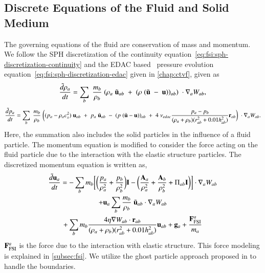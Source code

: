 \subsection{Discrete Equations of the Fluid and Solid Medium}\label{subsec:discrete-fluid}
The governing equations of the fluid are conservation of mass and momentum. We
follow the SPH discretization of the continuity
equation~\eqref{eq:fsi:sph-discretization-continuity} and the EDAC
based~\parencite{PRKP:edac-sph-iccm2015} pressure evolution
equation~\eqref{eq:fsi:sph-discretization-edac} given in \cref{chap:ctvf}, given
as
\begin{equation}
  \label{eq:fsi:sph-discretization-continuity}
  \frac{\tilde{d}\rho_a}{dt} = \sum_{b} \; \frac{m_b}{\rho_{b}} \; (
  \rho_{a} \; \tilde{\mathbf{u}}_{ab} \; + \;
  (\rho \; (\tilde{\mathbf{u}} \; - \;
  \mathbf{u}))_{ab}) \; \cdot \nabla_{a} W_{ab},
\end{equation}
\begin{multline}
  \label{eq:fsi:sph-discretization-edac}
  \frac{\tilde{d}p_a}{dt} = \sum_{b} \; \frac{m_b}{\rho_{b}} \; \bigg(
  (p_{a} - \rho_{a} c_{s}^2) \; \mathbf{u}_{ab} \; + \;
  p_{a} \; \tilde{\mathbf{u}}_{ab} \; - \;
  (p \; (\tilde{\mathbf{u}} - \mathbf{u}))_{ab} \; + \;
  4 \; \nu_{edac}
  \frac{p_a - p_b}{(\rho_a + \rho_b) (r^2_{ab} + 0.01 h_{ab}^{2})} \mathbf{r}_{ab}
  \bigg) \; \cdot \nabla_{a} W_{ab}.
\end{multline}
%
Here, the summation also includes the solid particles in the influence of a
fluid particle. The momentum equation is modified to consider the force
acting on the fluid particle due to the interaction with the elastic structure
particles. The discretized momentum equation is written as,
\begin{multline}
  \label{eq:fsi:sph-momentum-fluid}
  \frac{\tilde{d}\mathbf{u}_{a}}{dt} = - \sum_{b} m_b \bigg[
  \bigg(\frac{p_a}{\rho_a^2} + \frac{p_b}{\rho_b^2}\bigg) \mathbf{I} -
  \bigg(\frac{\mathbf{A}_a}{\rho_a^2} + \frac{\mathbf{A}_b}{\rho_b^2} + \Pi_{ab}
  \mathbf{I} \bigg) \bigg]
  \cdot \nabla_{a} W_{ab} \\
  + \mathbf{u}_{a} \sum_{b} \frac{m_b}{\rho_{b}} \; \tilde{\mathbf{u}}_{ab} \cdot
  \nabla_{a} W_{ab} \\+ \sum_{b} m_b \frac{4 \eta \nabla W_{ab}\cdot
    \mathbf{r}_{ab}}{(\rho_a + \rho_b) (r_{ab}^2 + 0.01 h_{ab}^2)} \mathbf{u}_{ab} +
  \mathbf{g}_{a} + \frac{\mathbf{F}^a_{\text{FSI}}}{m_a}
\end{multline}
$\mathbf{F}^a_{\text{FSI}}$ is the force due to the interaction with elastic
structure. This force modeling is explained in \cref{subsec:fsi}. We utilize the
ghost particle approach proposed in \parencite{Adami2012} to handle the boundaries.


